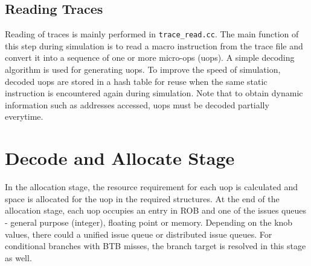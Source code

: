 


\subsection{Reading Traces} 

Reading of traces is mainly performed in \Verb+trace_read.cc+. The
main function of this step during simulation is to read a macro
instruction from the trace file and convert it into a sequence of one
or more micro-ops (uops). A simple decoding algorithm is used for
generating uops. To improve the speed of simulation, decoded uops are
stored in a hash table for reuse when the same static instruction is
encountered again during simulation. Note that to obtain dynamic
information such as addresses accessed, uops must be decoded partially
everytime.



\section{Decode and  Allocate Stage}



In the allocation stage, the resource requirement for each uop is calculated
and space is allocated for the uop in the required structures. At the end of the
allocation stage, each uop occupies an entry in ROB and one of the issues
queues - general purpose (integer), floating point or memory. Depending on the
knob values, there could a unified issue queue or distributed issue queues. For
conditional branches with BTB misses, the branch target is resolved in this
stage as well.


